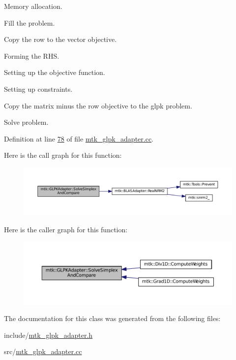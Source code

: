 \begin{DoxyEnumerate}
\item Memory allocation.
\item Fill the problem.
\item Copy the row to the vector objective.
\item Forming the R\-H\-S.
\item Setting up the objective function.
\item Setting up constraints.
\item Copy the matrix minus the row objective to the glpk problem.
\item Solve problem. 
\end{DoxyEnumerate}

Definition at line \hyperlink{mtk__glpk__adapter_8cc_source_l00078}{78} of file \hyperlink{mtk__glpk__adapter_8cc_source}{mtk\-\_\-glpk\-\_\-adapter.\-cc}.



Here is the call graph for this function\-:
\nopagebreak
\begin{figure}[H]
\begin{center}
\leavevmode
\includegraphics[width=350pt]{classmtk_1_1GLPKAdapter_a834480aca83e3c0d09fdab7fdb7e8a3f_cgraph}
\end{center}
\end{figure}




Here is the caller graph for this function\-:\nopagebreak
\begin{figure}[H]
\begin{center}
\leavevmode
\includegraphics[width=350pt]{classmtk_1_1GLPKAdapter_a834480aca83e3c0d09fdab7fdb7e8a3f_icgraph}
\end{center}
\end{figure}




The documentation for this class was generated from the following files\-:\begin{DoxyCompactItemize}
\item 
include/\hyperlink{mtk__glpk__adapter_8h}{mtk\-\_\-glpk\-\_\-adapter.\-h}\item 
src/\hyperlink{mtk__glpk__adapter_8cc}{mtk\-\_\-glpk\-\_\-adapter.\-cc}\end{DoxyCompactItemize}
